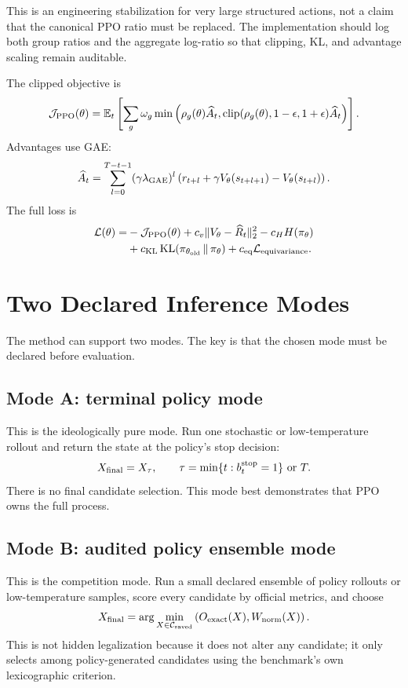 \documentclass[11pt]{article}
\newcommand{\E}{\mathbb{E}}
\newcommand{\KL}{\operatorname{KL}}
\newcommand{\clip}{\operatorname{clip}}
\newcommand{\ExactOv}{O_{\rm exact}}
\newcommand{\WireNorm}{W_{\rm norm}}
\begin{document}
This is an engineering stabilization for very large structured actions, not a claim that the canonical PPO ratio must be replaced. The implementation should log both group ratios and the aggregate log-ratio so that clipping, KL, and advantage scaling remain auditable.

The clipped objective is
\[
    \mathcal J_{\rm PPO}(\theta)=
    \E_t\left[\sum_g\omega_g
    \min\left(
        \rho_g(\theta)\widehat A_t,
        \clip(\rho_g(\theta),1-\epsilon,1+\epsilon)\widehat A_t
    \right)\right].
\]
Advantages use GAE:
\[
    \widehat A_t=\sum_{l=0}^{T-t-1}(\gamma\lambda_{\rm GAE})^l
    \left(r_{t+l}+\gamma V_\theta(s_{t+l+1})-V_\theta(s_{t+l})\right).
\]
The full loss is
\[
\begin{aligned}
    \mathcal L(\theta)
    =&-\mathcal J_{\rm PPO}(\theta)
    +c_v\|V_\theta-\widehat R_t\|_2^2
    -c_H H(\pi_\theta)\\
    &+c_{\rm KL}\KL(\pi_{\theta_{\rm old}}\,\|\,\pi_\theta)
    +c_{\rm eq}\mathcal L_{\rm equivariance}.
\end{aligned}
\]

\section{Two Declared Inference Modes}

The method can support two modes. The key is that the chosen mode must be declared before evaluation.

\subsection{Mode A: terminal policy mode}

This is the ideologically pure mode. Run one stochastic or low-temperature rollout and return the state at the policy's stop decision:
\[
    X_{\rm final}=X_{\tau},
    \qquad
    \tau=\min\{t:b_t^{\rm stop}=1\}\ \text{or}\ T.
\]
There is no final candidate selection. This mode best demonstrates that PPO owns the full process.

\subsection{Mode B: audited policy ensemble mode}

This is the competition mode. Run a small declared ensemble of policy rollouts or low-temperature samples, score every candidate by official metrics, and choose
\[
    X_{\rm final}
    =\arg\min_{X\in\mathcal C_{\rm saved}}
    \left(\ExactOv(X),\WireNorm(X)\right).
\]
This is not hidden legalization because it does not alter any candidate; it only selects among policy-generated candidates using the benchmark's own lexicographic criterion.
\end{document}
